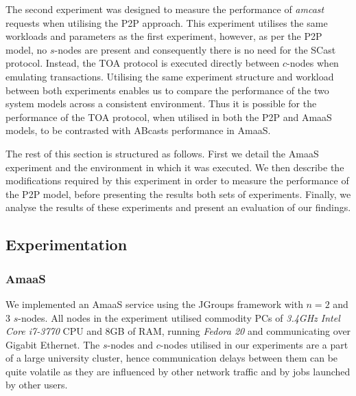    The second experiment was designed to measure the performance of \emph{amcast} requests when utilising the P2P approach.  This experiment utilises the same workloads and parameters as the first experiment, however, as per the P2P model, no $s$-nodes are present and consequently there is no need for the \textsf{SCast} protocol.  Instead, the TOA protocol is executed directly between $c$-nodes when emulating transactions.  Utilising the same experiment structure and workload between both experiments enables us to compare the performance of the two system models across a consistent environment.  Thus it is possible for the performance of the TOA protocol, when utilised in both the P2P and \textsf{AmaaS} models, to be contrasted with \textsf{ABcast}s performance in \textsf{AmaaS}.  
	
	The rest of this section is structured as follows.  First we detail the \textsf{AmaaS} experiment and the environment in which it was executed.  We then describe the modifications required by this experiment in order to measure the performance of the P2P model, before presenting the results both sets of experiments.  Finally, we analyse the results of these experiments and present an evaluation of our findings.  
		
	\subsection{Experimentation}\label{ssec:emulated_transaction_experiments}
	\subsubsection*{AmaaS}
	We implemented an \textsf{AmaaS} service using the JGroups\citep{JGroups} framework with $n=2$ and $3$ $s$-nodes.  All nodes in the experiment utilised commodity PCs of \emph{3.4GHz Intel Core i7-3770} CPU and 8GB of RAM, running \emph{Fedora 20} and communicating over Gigabit Ethernet. The $s$-nodes and $c$-nodes utilised in our experiments are a part of a large university cluster, hence communication delays between them can be quite volatile as they are influenced by other network traffic and by jobs launched by other users.
	
